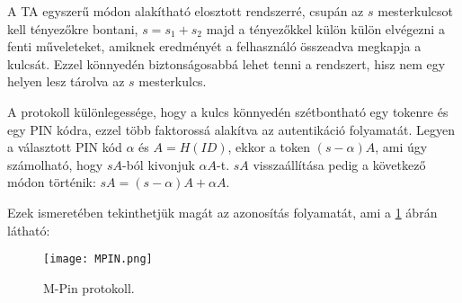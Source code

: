 A TA egyszerű módon alakítható elosztott rendszerré, csupán az $s$ mesterkulcsot kell tényezőkre bontani, $s = s_1 + s_2$ majd a tényezőkkel külön külön elvégezni a fenti műveleteket, amiknek eredményét a felhasználó összeadva megkapja a kulcsát. Ezzel könnyedén biztonságosabbá lehet tenni a rendszert, hisz nem egy helyen lesz tárolva az $s$ mesterkulcs.

A protokoll különlegessége, hogy a kulcs könnyedén szétbontható egy tokenre és egy PIN kódra, ezzel több faktorossá alakítva az autentikáció folyamatát. Legyen a választott PIN kód $\alpha$ és $A = H(ID)$, ekkor a token $(s - \alpha)A$, ami úgy számolható, hogy $sA$-ból kivonjuk $\alpha A$-t. $sA$ visszaállítása pedig a következő módon történik: $sA = (s - \alpha)A + \alpha A$.

Ezek ismeretében tekinthetjük magát az azonosítás folyamatát, ami a \ref{Figure::MPIN} ábrán látható:

\begin{figure}[H]
    \centering
    \texttt{[image: MPIN.png]}
    \caption{M-Pin protokoll.}
    \label{Figure::MPIN}
\end{figure}